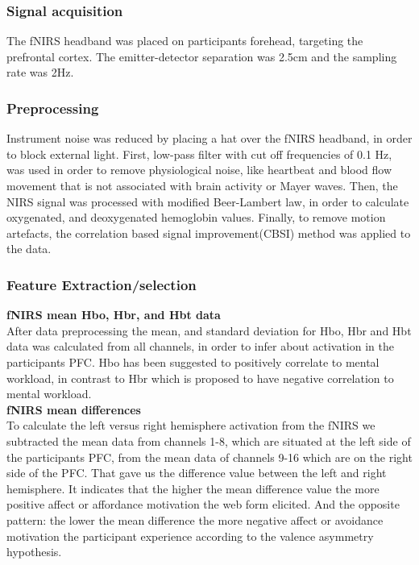 \documentclass[../main/Feedback.tex]{subfiles}
\begin{document}
\subsubsection{Signal acquisition}
The fNIRS headband was placed on participants forehead, targeting the prefrontal cortex. The emitter-detector separation was 2.5cm and the sampling rate was 2Hz.
\subsubsection{Preprocessing}
Instrument noise was reduced by placing a hat over the fNIRS headband, in order to block external light.
First, low-pass filter with cut off frequencies of 0.1 Hz, was used in order to remove physiological noise, like heartbeat and blood flow movement that is not associated with brain activity or Mayer waves.
Then, the NIRS signal was processed with modified Beer-Lambert law\cite{cope1988system}, in order to calculate oxygenated, and deoxygenated hemoglobin values.
Finally, to remove motion artefacts, the correlation based signal improvement(CBSI)\cite{cui2010functional} method was applied to the data.
\subsubsection{Feature Extraction/selection}
\textbf{fNIRS mean Hbo, Hbr, and Hbt data}\leavevmode\\
After data preprocessing the mean, and standard deviation for Hbo, Hbr and Hbt data was calculated from all channels, in order to infer about activation in the participants PFC. Hbo has been suggested to positively correlate to mental workload, in contrast to Hbr which is proposed to have negative correlation to mental workload.\\
\textbf{fNIRS mean differences}\leavevmode\\
To calculate the left versus right hemisphere activation from the fNIRS we subtracted the mean data from channels 1-8, which are situated at the left side of the participants PFC, from the mean data of channels 9-16 which are on the right side of the PFC. That gave us the difference value between the left and right hemisphere. It indicates that the higher the mean difference value the more positive affect or affordance motivation the web form elicited. And the opposite pattern: the lower the mean difference the more negative affect or avoidance motivation the participant experience according to the valence asymmetry hypothesis.
\end{document}
